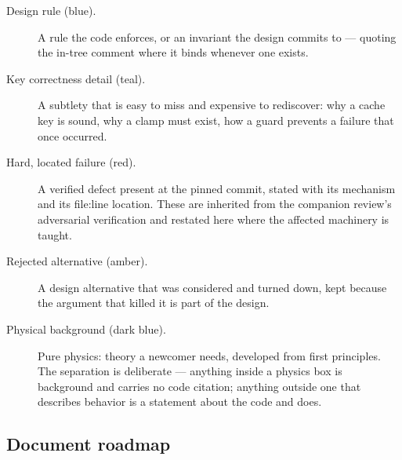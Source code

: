 \begin{description}
\item[Design rule (blue).] A rule the code enforces, or an invariant the design commits to
  --- quoting the in-tree comment where it binds whenever one exists.
\item[Key correctness detail (teal).] A subtlety that is easy to miss and expensive to
  rediscover: why a cache key is sound, why a clamp must exist, how a guard prevents a
  failure that once occurred.
\item[Hard, located failure (red).] A verified defect present at the pinned commit, stated
  with its mechanism and its file:line location. These are inherited from the companion
  review's adversarial verification and restated here where the affected machinery is
  taught.
\item[Rejected alternative (amber).] A design alternative that was considered and turned
  down, kept because the argument that killed it is part of the design.
\item[Physical background (dark blue).] Pure physics: theory a newcomer needs, developed
  from first principles. The separation is deliberate --- anything inside a physics box is
  background and carries no code citation; anything outside one that describes behavior is a
  statement about the code and does.
\end{description}

\subsection{Document roadmap}\label{sec:intro-roadmap}

